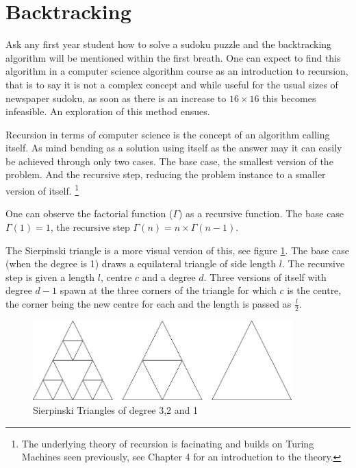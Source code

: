 \documentclass[a4paper,11pt]{report}
\begin{document}
\section{Backtracking}
Ask any first year student how to solve a sudoku puzzle and the backtracking algorithm will be mentioned within the first breath. One can expect to find this algorithm in a computer science algorithm course as an introduction to recursion, that is to say it is not a complex concept and while useful for the usual sizes of newspaper sudoku, as soon as there is an increase to $16 \times 16$ this becomes infeasible. An exploration of this method ensues.

Recursion in terms of computer science is the concept of an algorithm calling itself. As mind bending as a solution using itself as the answer may it can easily be achieved through only two cases. The base case, the smallest version of the problem. And the recursive step, reducing the problem instance to a smaller version of itself. \footnote{The underlying theory of recursion is facinating and builds on Turing Machines seen previously, see \cite{salomaa1985computation} Chapter 4 for an introduction to the theory.}

One can observe the factorial function ($\Gamma$) as a recursive function. The base case $\Gamma(1)=1$, the recursive step $\Gamma(n)=n\times \Gamma(n-1)$.

The Sierpinski triangle is a more visual version of this, see figure \ref{fig:sieptri}. The base case (when the degree is 1) draws a equilateral triangle of side length $l$. The recursive step is given a length $l$, centre $c$ and a degree $d$. Three versions of itself with degree $d-1$ spawn at the three corners of the triangle for which $c$ is the centre, the corner being the new centre for each and the length is passed as $\frac{l}{2}$.

\begin{figure}[!h]
\begin{center}
		\includegraphics[width=100mm]{figures/SiepTri.png}
\end{center}
		\caption{Sierpinski Triangles of degree 3,2 and 1\label{fig:sieptri}}
\end{figure}
\end{document}

